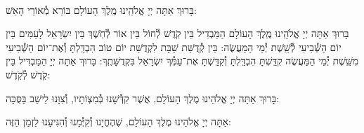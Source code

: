 \documentclass[twoside, openany, parskip=half, 11pt]{book}
\begin{document}
\begin{sometimes}

\\
בָּרוּךְ אַתָּה יְיָ אֱלֹהֵֽינוּ מֶֽלֶךְ הָעוֹלָם בּוֹרֵא מְ֯אוֹרֵי הָאֵשׁ:

בָּרוּךְ אַתָּה יְיָ אֱלֹהֵֽינוּ מֶֽלֶךְ הָעוֹלָם הַמַּבְדִיל בֵּין קֹֽדֶשׁ לְ֯חוֹל בֵּין אוֹר לְ֯חֹֽשֶׁךְ בֵּין יִשְׂרָאֵל לָעַמִּים בֵּין יוֹם הַשְּׁ֯בִיעִי לְ֯שֵֽׁשֶׁת יְ֯מֵי הַמַּעֲשֶׂה: בֵּין קְ֯דֻשַּׁת שַׁבָּת לִקְדֻשַּׁת יוֹם טוֹב הִבְדַּֽלְתָּ וְ֯אֶת־יוֹם הַשְּׁ֯בִיעִי מִשֵּֽׁשֶׁת יְ֯מֵי הַמַּעֲשֶׂה קִדַּֽשְׁתָּ הִבְדַּֽלְתָּ וְ֯קִדַּֽשְׁתָּ אֶת־עַמְּ֯ךָ יִשְׂרָאֵל בִּקְדֻשָּׁתֶֽךָ: בָּרוּךְ אַתָּה יְיָ הַמַּבְדִּיל בֵּין קֹֽדֶשׁ לְ֯קֹֽדֶשׁ:

\end{sometimes}



\vspace{-.5\baselineskip}
בָּרוּךְ אַתָּה יְיָ אֱלֹהֵינוּ מֶלֶךְ הָעוֹלָם, אֲשֶׁר קִדְּ֯שָׁנוּ בְּ֯מִצְוֹתָיו, וְ֯צִוָּנוּ לֵישֵׁב בַּסֻּכָּה:

אַתָּה יְיָ אֱלֹהֵינוּ מֶלֶךְ הָעוֹלָם, שֶׁהֶחֱיָנוּ וְ֯קִיְּ֯מָנוּ וְ֯הִגִּיעָנוּ לַזְמַן הַזֶּה:


%
%
%
%
%
%
%
%
\end{document}
